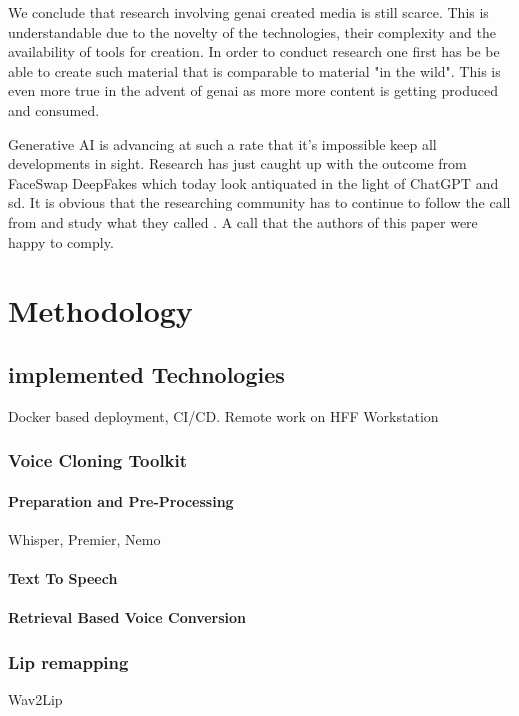 \documentclass[
  a4paper,  %
  twoside,  %
  bibliography=totoc,
  headsepline,
  cleardoublepage=empty,
  parskip=half,
  draft=false
]{scrbook}
\begin{document}
We conclude that research involving \gls{genai} created media is still scarce. This is understandable due to the novelty of the technologies, their complexity and the availability of tools for creation. In order to conduct research one first has be be able to create such material that is comparable to material "in the wild". This is even more true in the advent of \gls{genai} as more more content is getting produced and consumed.













Generative AI is advancing at such a rate that it's impossible keep all developments in sight. Research has just caught up with the outcome from FaceSwap DeepFakes which today look antiquated in the light of ChatGPT and \gls{sd}. 
It is obvious that the researching community has to continue to follow the call from \citet{hancockSocialImpactDeepfakes2021} and study what they called . A call that the authors of this paper were happy to comply.

\chapter{Methodology}
\section{implemented Technologies}
\label{implementation}
Docker based deployment, CI/CD. Remote work on HFF Workstation

\subsection{Voice Cloning Toolkit}
\label{sec:dvt}
\subsubsection{Preparation and Pre-Processing}
Whisper, Premier, Nemo
\subsubsection{Text To Speech}
\subsubsection{Retrieval Based Voice Conversion}
\subsection{Lip remapping}
Wav2Lip
\end{document}
